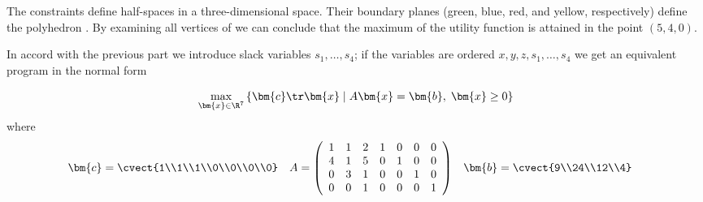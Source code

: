\begin{minipage}[t]{0.4\textwidth}
  \vskip 0pt
\noindent
The constraints define half-spaces in a three-dimensional space. Their boundary planes
(green, blue, red, and yellow, respectively) define the polyhedron \dom.
By examining all vertices of \dom we can conclude that the maximum of the utility
function is attained in the point 
$(5,4,0)$. 
\end{minipage}\hfill
\begin{minipage}[t]{0.6\textwidth}
  \vskip 0pt

\begin{center}
  \end{center}
\end{minipage}

\noindent 
In accord with the previous part we introduce slack variables  $s_1,\ldots,s_4$;
if the variables are ordered $x,y,z,s_1,\ldots,s_4$ we get an equivalent program in 
the normal form

$$\max_{\bm{x}\in\R^7}\left\{ \bm{c}\tr\bm{x} \mid A\bm{x}=\bm{b},\; \bm{x}\ge0
\right\}$$ 
%
where
\begin{align*}
 \bm{c}&=\cvect{1\\1\\1\\0\\0\\0\\0}
&A&=\left(\begin{array}{ccccccc}
  1&1&2&1&0&0&0\\
  4&1&5&0&1&0&0\\
  0&3&1&0&0&1&0\\
  0&0&1&0&0&0&1
\end{array}\right)
&\bm{b}&=\cvect{9\\24\\12\\4}
\end{align*}


